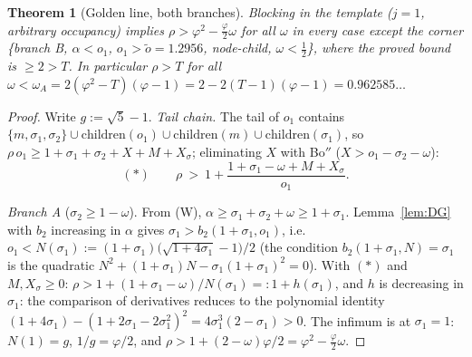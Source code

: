 \documentclass[11pt]{article}
\newtheorem{theorem}{Theorem}
\theoremstyle{definition}
\begin{document}
\begin{theorem}[Golden line, both branches]\label{thm:DGp}
Blocking in the template ($j=1$, arbitrary occupancy) implies
$\rho>\varphi^2-\tfrac{\varphi}{2}\omega$ for all $\omega$ in every case
except the corner \{branch B, $\alpha<o_1$, $o_1>\tilde o=1.2956$,
node-child, $\omega<\tfrac12$\}, where the proved bound is $\ge2>T$. In
particular $\rho>T$ for all $\omega<\omega_A=2(\varphi^2-T)(\varphi-1)
=2-2(T-1)(\varphi-1)=0.962585\dots$
\end{theorem}
\begin{proof}
Write $g:=\sqrt5-1$. \emph{Tail chain.} The tail of $o_1$ contains
$\{m,\sigma_1,\sigma_2\}\cup\mathrm{children}(o_1)\cup\mathrm{children}(m)
\cup\mathrm{children}(\sigma_1)$, so
$\rho\,o_1\ge1+\sigma_1+\sigma_2+X+M+X_\sigma$; eliminating $X$ with
Bo$''$ ($X>o_1-\sigma_2-\omega$):
\[
(*)\qquad \rho\ >\ 1+\frac{1+\sigma_1-\omega+M+X_\sigma}{o_1}.
\]

\emph{Branch A} ($\sigma_2\ge1-\omega$). From (W),
$\alpha\ge\sigma_1+\sigma_2+\omega\ge1+\sigma_1$. Lemma~\ref{lem:DG} with
$b_2$ increasing in $\alpha$ gives $\sigma_1>b_2(1+\sigma_1,o_1)$, i.e.\
$o_1<N(\sigma_1):=(1+\sigma_1)\bigl(\sqrt{1+4\sigma_1}-1\bigr)/2$ (the
condition $b_2(1+\sigma_1,N)=\sigma_1$ is the quadratic
$N^2+(1+\sigma_1)N-\sigma_1(1+\sigma_1)^2=0$). With $(*)$ and
$M,X_\sigma\ge0$: $\rho>1+(1+\sigma_1-\omega)/N(\sigma_1)=:1+h(\sigma_1)$,
and $h$ is decreasing in $\sigma_1$: the comparison of derivatives reduces
to the polynomial identity
$(1+4\sigma_1)-(1+2\sigma_1-2\sigma_1^2)^2=4\sigma_1^3(2-\sigma_1)>0$.
The infimum is at $\sigma_1=1$: $N(1)=g$, $1/g=\varphi/2$, and
$\rho>1+(2-\omega)\varphi/2=\varphi^2-\tfrac{\varphi}{2}\omega$.


\end{proof}
\end{document}
